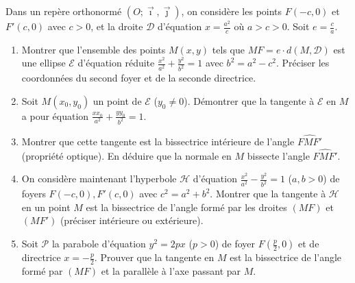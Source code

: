 \documentclass[11pt]{article}
\begin{document}
\begin{exercice}
Dans un repère orthonormé $(O;\vec{\imath},\vec{\jmath})$, on considère les points $F(-c,0)$ et $F'(c,0)$ avec $c > 0$, et la droite $\mathcal{D}$ d'équation $x = \frac{a^2}{c}$ où $a > c > 0$. Soit $e = \frac{c}{a}$.
\begin{enumerate}
    \item Montrer que l'ensemble des points $M(x,y)$ tels que $MF = e \cdot d(M,\mathcal{D})$ est une ellipse $\mathcal{E}$ d'équation réduite $\frac{x^2}{a^2} + \frac{y^2}{b^2} = 1$ avec $b^2 = a^2 - c^2$. Préciser les coordonnées du second foyer et de la seconde directrice.
    \item Soit $M(x_0,y_0)$ un point de $\mathcal{E}$ ($y_0 \neq 0$). Démontrer que la tangente à $\mathcal{E}$ en $M$ a pour équation $\frac{xx_0}{a^2} + \frac{yy_0}{b^2} = 1$.
    \item Montrer que cette tangente est la bissectrice intérieure de l'angle $\widehat{FMF'}$ (propriété optique). En déduire que la normale en $M$ bissecte l'angle $\widehat{FMF'}$.
    \item On considère maintenant l'hyperbole $\mathcal{H}$ d'équation $\frac{x^2}{a^2} - \frac{y^2}{b^2} = 1$ ($a,b > 0$) de foyers $F(-c,0), F'(c,0)$ avec $c^2 = a^2 + b^2$. Montrer que la tangente à $\mathcal{H}$ en un point $M$ est la bissectrice de l'angle formé par les droites $(MF)$ et $(MF')$ (préciser intérieure ou extérieure).
    \item Soit $\mathcal{P}$ la parabole d'équation $y^2 = 2px$ ($p>0$) de foyer $F(\frac{p}{2},0)$ et de directrice $x = -\frac{p}{2}$. Prouver que la tangente en $M$ est la bissectrice de l'angle formé par $(MF)$ et la parallèle à l'axe passant par $M$.
\end{enumerate}
\end{exercice}
\end{document}
